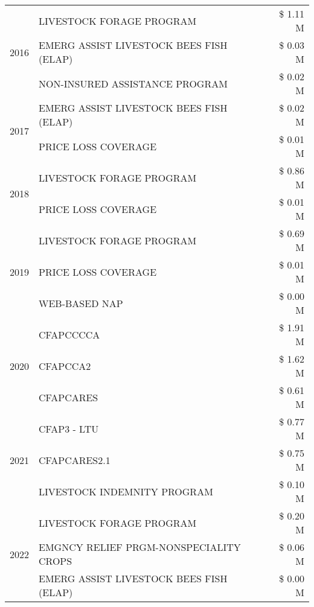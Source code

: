 \begin{tabular}{llr}
\cline{1-3}
\multirow[t]{3}{*}{2016} & LIVESTOCK FORAGE PROGRAM & \$ 1.11 M \\
 & EMERG ASSIST LIVESTOCK BEES FISH (ELAP) & \$ 0.03 M \\
 & NON-INSURED ASSISTANCE PROGRAM & \$ 0.02 M \\
\cline{1-3}
\multirow[t]{2}{*}{2017} & EMERG ASSIST LIVESTOCK BEES FISH (ELAP) & \$ 0.02 M \\
 & PRICE LOSS COVERAGE & \$ 0.01 M \\
\cline{1-3}
\multirow[t]{2}{*}{2018} & LIVESTOCK FORAGE PROGRAM & \$ 0.86 M \\
 & PRICE LOSS COVERAGE & \$ 0.01 M \\
\cline{1-3}
\multirow[t]{3}{*}{2019} & LIVESTOCK FORAGE PROGRAM & \$ 0.69 M \\
 & PRICE LOSS COVERAGE & \$ 0.01 M \\
 & WEB-BASED NAP & \$ 0.00 M \\
\cline{1-3}
\multirow[t]{3}{*}{2020} & CFAPCCCCA & \$ 1.91 M \\
 & CFAPCCA2 & \$ 1.62 M \\
 & CFAPCARES & \$ 0.61 M \\
\cline{1-3}
\multirow[t]{3}{*}{2021} & CFAP3 - LTU & \$ 0.77 M \\
 & CFAPCARES2.1 & \$ 0.75 M \\
 & LIVESTOCK INDEMNITY PROGRAM & \$ 0.10 M \\
\cline{1-3}
\multirow[t]{3}{*}{2022} & LIVESTOCK FORAGE PROGRAM & \$ 0.20 M \\
 & EMGNCY RELIEF PRGM-NONSPECIALITY CROPS & \$ 0.06 M \\
 & EMERG ASSIST LIVESTOCK BEES FISH (ELAP) & \$ 0.00 M \\
\cline{1-3}
\bottomrule
\end{tabular}
